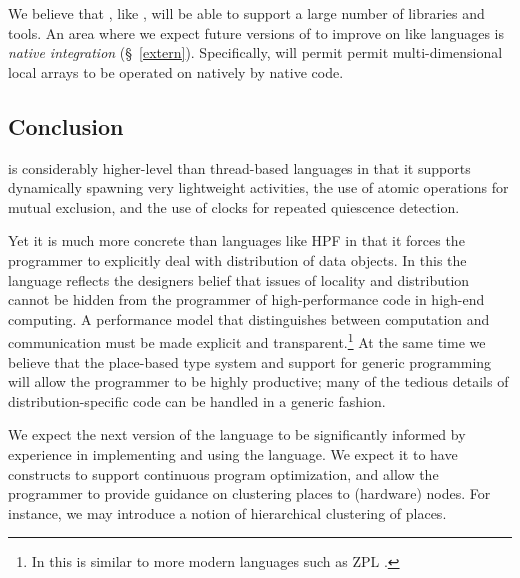We believe that \Xten{}, like \java{}, will be able to support a large
number of libraries and tools. An area where we expect future versions
of \Xten{} to improve on \java{} like languages is {\em native
integration} (\S~\ref{extern}). Specifically, \Xten{} will permit
permit multi-dimensional local arrays to be operated on natively by
native code.

\subsection{Conclusion}
{}\Xten{} is considerably higher-level than thread-based languages in
that it supports dynamically spawning very lightweight activities, the
use of atomic operations for mutual exclusion, and the use of clocks
for repeated quiescence detection.

Yet it is much more concrete than languages like HPF in
that it forces the programmer to explicitly deal with distribution of
data objects. In this the language reflects the designers belief that
issues of locality and distribution cannot be hidden from the
programmer of high-performance code in high-end computing.  A
performance model that distinguishes between computation and
communication must be made explicit and transparent.\footnote{In this
\Xten{} is similar to more modern languages such as ZPL \cite{zpl}.} At
the same time we believe that the place-based type system and support
for generic programming will allow the \Xten{} programmer to be highly
productive; many of the tedious details of distribution-specific code
can be handled in a generic fashion.

We expect the next version of the language to be significantly
informed by experience in implementing and using the language. We
expect it to have constructs to support continuous program
optimization, and allow the programmer to provide guidance on
clustering places to (hardware) nodes. For instance, we may introduce
a notion of hierarchical clustering of places.





